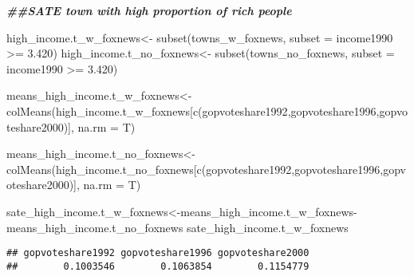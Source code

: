 \documentclass[
]{article}
\newenvironment{Shaded}{\begin{snugshade}}{\end{snugshade}}
\newcommand{\AttributeTok}[1]{\textcolor[rgb]{0.77,0.63,0.00}{#1}}
\newcommand{\DocumentationTok}[1]{\textcolor[rgb]{0.56,0.35,0.01}{\textbf{\textit{#1}}}}
\newcommand{\FloatTok}[1]{\textcolor[rgb]{0.00,0.00,0.81}{#1}}
\newcommand{\FunctionTok}[1]{\textcolor[rgb]{0.00,0.00,0.00}{#1}}
\newcommand{\NormalTok}[1]{#1}
\newcommand{\OtherTok}[1]{\textcolor[rgb]{0.56,0.35,0.01}{#1}}
\newcommand{\SpecialCharTok}[1]{\textcolor[rgb]{0.00,0.00,0.00}{#1}}
\newcommand{\StringTok}[1]{\textcolor[rgb]{0.31,0.60,0.02}{#1}}
\begin{document}
\begin{Shaded}
\begin{Highlighting}[]
\DocumentationTok{\#\#SATE town with high proportion of rich people}

\NormalTok{high\_income.t\_w\_foxnews}\OtherTok{\textless{}{-}} \FunctionTok{subset}\NormalTok{(towns\_w\_foxnews, }\AttributeTok{subset =}\NormalTok{ income1990 }\SpecialCharTok{\textgreater{}=} \FloatTok{3.420}\NormalTok{)}
\NormalTok{high\_income.t\_no\_foxnews}\OtherTok{\textless{}{-}} \FunctionTok{subset}\NormalTok{(towns\_no\_foxnews, }\AttributeTok{subset =}\NormalTok{ income1990 }\SpecialCharTok{\textgreater{}=} \FloatTok{3.420}\NormalTok{)}

\NormalTok{means\_high\_income.t\_w\_foxnews}\OtherTok{\textless{}{-}}\FunctionTok{colMeans}\NormalTok{(high\_income.t\_w\_foxnews[}\FunctionTok{c}\NormalTok{(}\StringTok{\textquotesingle{}gopvoteshare1992\textquotesingle{}}\NormalTok{,}\StringTok{\textquotesingle{}gopvoteshare1996\textquotesingle{}}\NormalTok{,}\StringTok{\textquotesingle{}gopvoteshare2000\textquotesingle{}}\NormalTok{)], }\AttributeTok{na.rm =}\NormalTok{ T)}

\NormalTok{means\_high\_income.t\_no\_foxnews}\OtherTok{\textless{}{-}}\FunctionTok{colMeans}\NormalTok{(high\_income.t\_no\_foxnews[}\FunctionTok{c}\NormalTok{(}\StringTok{\textquotesingle{}gopvoteshare1992\textquotesingle{}}\NormalTok{,}\StringTok{\textquotesingle{}gopvoteshare1996\textquotesingle{}}\NormalTok{,}\StringTok{\textquotesingle{}gopvoteshare2000\textquotesingle{}}\NormalTok{)], }\AttributeTok{na.rm =}\NormalTok{ T)}

\NormalTok{sate\_high\_income.t\_w\_foxnews}\OtherTok{\textless{}{-}}\NormalTok{means\_high\_income.t\_w\_foxnews}\SpecialCharTok{{-}}\NormalTok{ means\_high\_income.t\_no\_foxnews}
\NormalTok{sate\_high\_income.t\_w\_foxnews}
\end{Highlighting}
\end{Shaded}

\begin{verbatim}
## gopvoteshare1992 gopvoteshare1996 gopvoteshare2000 
##        0.1003546        0.1063854        0.1154779
\end{verbatim}
\end{document}

